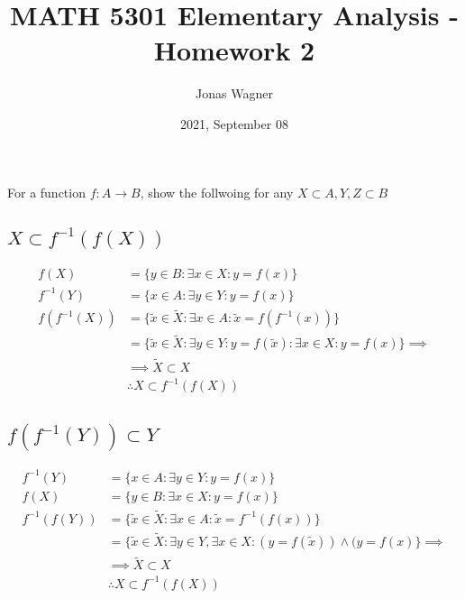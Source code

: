 \documentclass[]{article}
\title{MATH 5301 Elementary Analysis - Homework 2}
\author{Jonas Wagner}
\date{2021, September 08}
\begin{document}
\maketitle

\section{}
For a function $f : A \rightarrow B$, show the follwoing for any $X \subset A, Y, Z \subset B$

\subsection{$X \subset f^{-1}(f(X))$}

\begin{align*}
	f(X) &= \{y \in B : \exists x \in X : y = f(x)\}\\
	f^{-1}(Y) &= \{x \in A : \exists y \in Y : y = f(x)\}\\
	f(f^{-1}(X)) &= \{\tilde{x} \in \tilde{X} : \exists x \in A : \tilde{x} = f(f^{-1}(x))\}\\
	&= \{\tilde{x} \in \tilde{X} : \exists y \in Y : y = f(\tilde{x}) :
		\exists x \in X : y = f(x)\} \implies\\
	&\implies \tilde{X} \subset X\\
	&\therefore X \subset f^{-1}(f(X))
\end{align*}




\subsection{$f(f^{-1}(Y)) \subset Y$}

\begin{align*}
	f^{-1}(Y) &= \{x \in A : \exists y \in Y : y = f(x)\}\\
	f(X) &= \{y \in B : \exists x \in X : y = f(x)\}\\
	f^{-1}(f(Y)) &= \{\tilde{x} \in \tilde{X} : \exists x \in A : \tilde{x} = f^{-1}(f(x))\}\\
	&= \{\tilde{x} \in \tilde{X} : \exists y \in Y, \exists x \in X : (y = f(\tilde{x})) 
		\land (y = f(x)\} \implies\\
	&\implies \tilde{X} \subset X\\
	&\therefore X \subset f^{-1}(f(X))
\end{align*}
\end{document}
